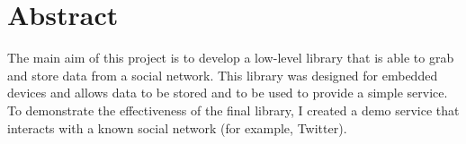 \chapter*{Abstract}

\hspace{15mm}The main aim of this project is to develop a low-level library that is able to grab and store data from a social network. This library was designed for embedded devices and allows data to be stored and to be used to provide a simple service. To demonstrate the effectiveness of the final library, I created a demo service that interacts with a known social network (for example, Twitter).




\clearpage
